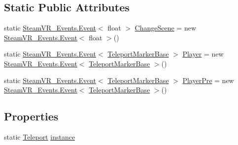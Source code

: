 \subsection*{Static Public Attributes}
\begin{DoxyCompactItemize}
\item 
static \mbox{\hyperlink{class_valve_1_1_v_r_1_1_steam_v_r___events_1_1_event}{Steam\+V\+R\+\_\+\+Events.\+Event}}$<$ float $>$ \mbox{\hyperlink{class_valve_1_1_v_r_1_1_interaction_system_1_1_teleport_af99d76ad52736e0fb59a308c4ead39fb}{Change\+Scene}} = new \mbox{\hyperlink{class_valve_1_1_v_r_1_1_steam_v_r___events_1_1_event}{Steam\+V\+R\+\_\+\+Events.\+Event}}$<$ float $>$()
\item 
static \mbox{\hyperlink{class_valve_1_1_v_r_1_1_steam_v_r___events_1_1_event}{Steam\+V\+R\+\_\+\+Events.\+Event}}$<$ \mbox{\hyperlink{class_valve_1_1_v_r_1_1_interaction_system_1_1_teleport_marker_base}{Teleport\+Marker\+Base}} $>$ \mbox{\hyperlink{class_valve_1_1_v_r_1_1_interaction_system_1_1_teleport_af8a6ad3703a4ee9ca1ea630058f5f92f}{Player}} = new \mbox{\hyperlink{class_valve_1_1_v_r_1_1_steam_v_r___events_1_1_event}{Steam\+V\+R\+\_\+\+Events.\+Event}}$<$ \mbox{\hyperlink{class_valve_1_1_v_r_1_1_interaction_system_1_1_teleport_marker_base}{Teleport\+Marker\+Base}} $>$()
\item 
static \mbox{\hyperlink{class_valve_1_1_v_r_1_1_steam_v_r___events_1_1_event}{Steam\+V\+R\+\_\+\+Events.\+Event}}$<$ \mbox{\hyperlink{class_valve_1_1_v_r_1_1_interaction_system_1_1_teleport_marker_base}{Teleport\+Marker\+Base}} $>$ \mbox{\hyperlink{class_valve_1_1_v_r_1_1_interaction_system_1_1_teleport_a6e2fa2d23b010b9a00a85ef546d8997a}{Player\+Pre}} = new \mbox{\hyperlink{class_valve_1_1_v_r_1_1_steam_v_r___events_1_1_event}{Steam\+V\+R\+\_\+\+Events.\+Event}}$<$ \mbox{\hyperlink{class_valve_1_1_v_r_1_1_interaction_system_1_1_teleport_marker_base}{Teleport\+Marker\+Base}} $>$()
\end{DoxyCompactItemize}
\subsection*{Properties}
\begin{DoxyCompactItemize}
\item 
static \mbox{\hyperlink{class_valve_1_1_v_r_1_1_interaction_system_1_1_teleport}{Teleport}} \mbox{\hyperlink{class_valve_1_1_v_r_1_1_interaction_system_1_1_teleport_a46adf4ce0792e06c79053aa5b000c495}{instance}}
\end{DoxyCompactItemize}


